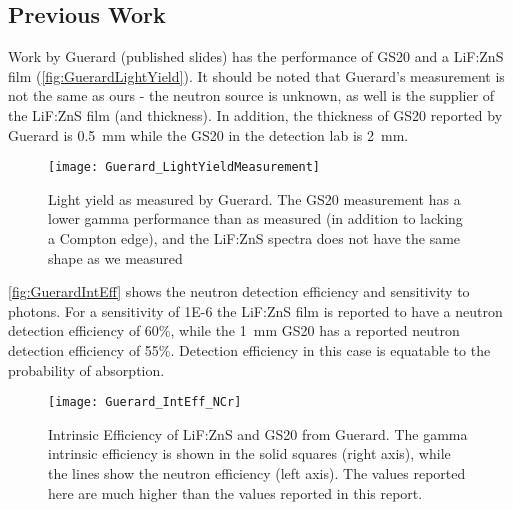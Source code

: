 \documentclass[onecolumn]{IEEEtran}
\begin{document}
\subsection{Previous Work}

Work by Guerard (published slides) has the performance of GS20 and a LiF:ZnS film (\autoref{fig:GuerardLightYield}).
It should be noted that Guerard's measurement is not the same as ours - the neutron source is unknown, as well is the supplier of the LiF:ZnS film (and thickness). 
In addition, the thickness of GS20 reported by Guerard is \SI{0.5}{\mm} while the GS20 in the detection lab is \SI{2}{\mm}.
\begin{figure}
  \centering
  \texttt{[image: Guerard\_LightYieldMeasurement]}
  \caption[Measured Light Yield (Guerard)]{Light yield as measured by Guerard. The GS20 measurement has a lower gamma performance than as measured (in addition to lacking a Compton edge), and the LiF:ZnS  spectra does not have the same shape as we measured}
	\label{fig:GuerardLightYield}
\end{figure}
\autoref{fig:GuerardIntEff} shows the neutron detection efficiency and sensitivity to  photons.
For a sensitivity of \num{1E-6} the LiF:ZnS film is reported to have a neutron detection efficiency of 60\%, while the \SI{1}{\mm} GS20 has a reported neutron detection efficiency of 55\%.
Detection efficiency in this case is equatable to the probability of absorption.
\begin{figure}
  \centering
  \texttt{[image: Guerard\_IntEff\_NCr]}
  \caption[Intrinsic Efficiency (Geurard)]{Intrinsic Efficiency of LiF:ZnS and GS20 from Guerard.  The gamma intrinsic efficiency is shown in the solid squares (right axis), while the lines show the neutron efficiency (left axis). The values reported here are much higher than the values reported in this report.}
	\label{fig:GuerardIntEff}
\end{figure}
\end{document}
